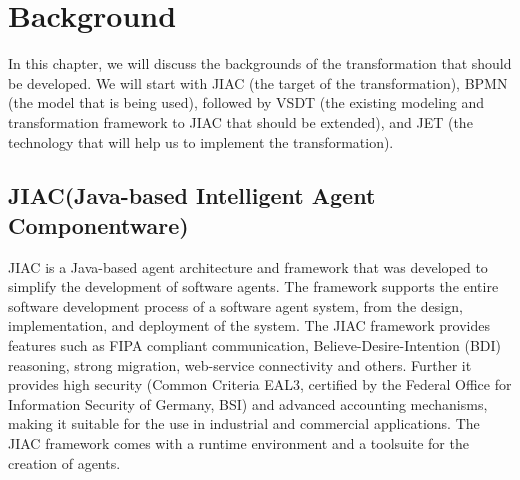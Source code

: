 \chapter{Background}

In this chapter, we will discuss the backgrounds of the transformation that should be developed. We will start with JIAC (the target of the transformation), BPMN (the model that is being used), followed by VSDT (the existing modeling and transformation framework to JIAC that should be extended), and JET (the technology that will help us to implement the transformation).

\section{JIAC(Java-based Intelligent Agent Componentware)}
JIAC is a Java-based agent architecture and framework that was developed to simplify the development of software agents. The framework supports the entire software development process of a software agent system, from the design, implementation, and deployment of the system. The JIAC framework provides features such as FIPA compliant communication,
Believe-Desire-Intention (BDI) reasoning, strong migration, web-service
connectivity and others. Further it provides high security (Common Criteria EAL3,
certified by the Federal Office for Information Security of Germany, BSI) and advanced
accounting mechanisms, making it suitable for the use in industrial and
commercial applications. The JIAC framework comes with a runtime environment
and a toolsuite for the creation of agents. \\\\ 

